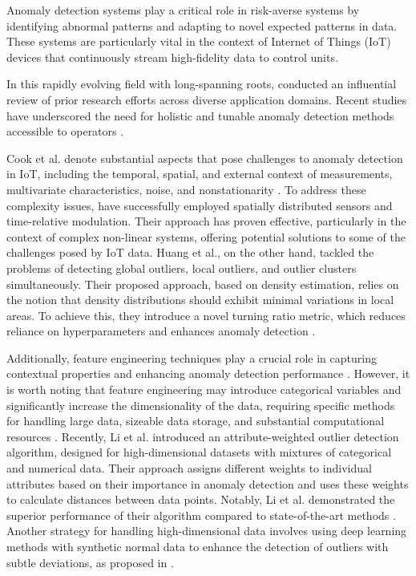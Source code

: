 Anomaly detection systems play a critical role in risk-averse systems by identifying abnormal patterns and adapting to novel expected patterns in data. These systems are particularly vital in the context of Internet of Things (IoT) devices that continuously stream high-fidelity data to control units.

In this rapidly evolving field with long-spanning roots, \citet{Chandola2009} conducted an influential review of prior research efforts across diverse application domains.
Recent studies have underscored the need for holistic and tunable anomaly detection methods accessible to operators \citep{Laptev2015, Kejariwal2015, Cook2020}.

Cook et al. denote substantial aspects that pose challenges to anomaly detection in IoT, including the temporal, spatial, and external context of measurements, multivariate characteristics, noise, and nonstationarity \citep{Cook2020}. To address these complexity issues, \citet{ZHANG2024121506} have successfully employed spatially distributed sensors and time-relative modulation. Their approach has proven effective, particularly in the context of complex non-linear systems, offering potential solutions to some of the challenges posed by IoT data. Huang et al., on the other hand, tackled the problems of detecting global outliers, local outliers, and outlier clusters simultaneously. Their proposed approach, based on density estimation, relies on the notion that density distributions should exhibit minimal variations in local areas. To achieve this, they introduce a novel turning ratio metric, which reduces reliance on hyperparameters and enhances anomaly detection \citep{HUANG2023120799}.

Additionally, feature engineering techniques play a crucial role in capturing contextual properties and enhancing anomaly detection performance \citep{Fan2019}. However, it is worth noting that feature engineering may introduce categorical variables and significantly increase the dimensionality of the data, requiring specific methods for handling large data, sizeable data storage, and substantial computational resources \citep{Talagala2021}. Recently, Li et al. introduced an attribute-weighted outlier detection algorithm, designed for high-dimensional datasets with mixtures of categorical and numerical data. Their approach assigns different weights to individual attributes based on their importance in anomaly detection and uses these weights to calculate distances between data points. Notably, Li et al. demonstrated the superior performance of their algorithm compared to state-of-the-art methods \citep{LI2024121304}. Another strategy for handling high-dimensional data involves using deep learning methods with synthetic normal data to enhance the detection of outliers with subtle deviations, as proposed in \citet{DU2024121161}.

